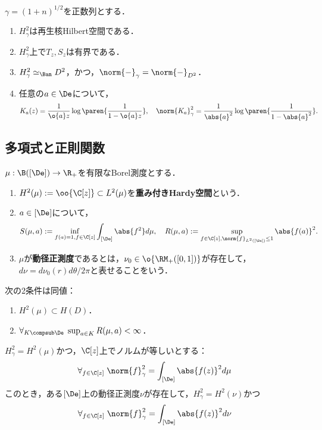 \documentclass[uplatex,dvipdfmx]{jsreport}
\begin{document}
\begin{corollary}[Dirichlet空間の性質]
    $\gamma=(1+n)^{1/2}$を正数列とする．
    \begin{enumerate}
        \item $H_\gamma^2$は再生核Hilbert空間である．
        \item $H^2_\gamma$上で$T_z,S_z$は有界である．
        \item $H^2_\gamma\simeq_\Ban D^2$，かつ，$\norm{-}_\gamma=\norm{-}_{D^2}$．
        \item 任意の$a\in\De$について，
        \[K_a(z)=\frac{1}{\o{a}z}\log\paren{\frac{1}{1-\o{a}z}},\quad\norm{K_a}_\gamma^2=\frac{1}{\abs{a}^2}\log\paren{\frac{1}{1-\abs{a}^2}}.\]
    \end{enumerate}
\end{corollary}

\subsection{多項式と正則関数}

\begin{definition}
    $\mu:\B([\De])\to\R_+$を有限なBorel測度とする．
    \begin{enumerate}
        \item $H^2(\mu):=\oo{\C[z]}\subset L^2(\mu)$を\textbf{重み付きHardy空間}という．
        \item $a\in[\De]$について，
        \[S(\mu,a):=\inf_{f(a)=1,f\in\C[z]}\int_{[\De]}\abs{f^2}d\mu,\quad R(\mu,a):=\sup_{f\in\C[z],\norm{f}_{L^2([\De])}\le1}\abs{f(a)}^2.\]
        \item $\mu$が\textbf{動径正測度}であるとは，$\nu_0\in \o{\RM_+([0,1])}$が存在して，$d\nu=d\nu_0(r)d\theta/2\pi$と表せることをいう．
    \end{enumerate}
\end{definition}

\begin{theorem}
    次の2条件は同値：
    \begin{enumerate}
        \item $H^2(\mu)\subset H(D)$．
        \item $\forall_{K\compsub\De}\;\sup_{a\in K}R(\mu,a)<\infty$．
    \end{enumerate}
\end{theorem}

\begin{theorem}
    $H^2_\gamma=H^2(\mu)$かつ，$\C[z]$上でノルムが等しいとする：
    \[\forall_{f\in\C[z]}\;\norm{f}^2_\gamma=\int_{[\De]}\abs{f(z)}^2d\mu\]
    このとき，ある$[\De]$上の動径正測度$\nu$が存在して，$H^2_\gamma=H^2(\nu)$かつ
    \[\forall_{f\in\C[z]}\;\norm{f}^2_\gamma=\int_{[\De]}\abs{f(z)}^2d\nu\]
\end{theorem}
\end{document}
